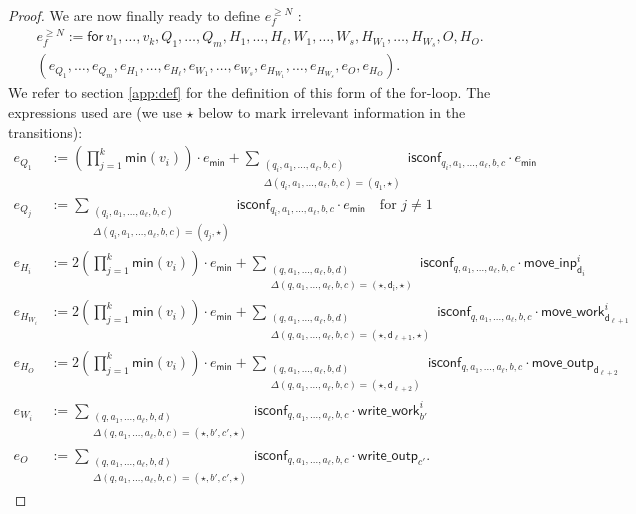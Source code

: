 \begin{proof}
We are now finally ready to define $e_f^{\geq N}$ :
\begin{multline*}
e_f^{\geq N}:= \mathsf{for\,} v_1,\ldots,v_{k},Q_1,\ldots,Q_m,H_1,\ldots,H_\ell,W_1,\ldots,W_s, H_{W_1},\ldots,H_{W_s},O,H_O . \\
(e_{Q_1},\ldots,e_{Q_m},e_{H_1},\ldots,e_{H_\ell},e_{W_1},\ldots,e_{W_s},e_{H_{W_1}},\ldots,e_{H_{W_s}},e_{O}, e_{H_O}).
\end{multline*}
We refer to section \ref{app:def} for the definition of this form of the for-loop. The expressions used are (we use $\star$ below to mark irrelevant information in the transitions):
 \allowdisplaybreaks
\begin{align*}
	e_{Q_1}&:=\left(\prod_{j=1}^{k} \textsf{min}(v_i)\right)\cdot e_{\mathsf{min}}
	+ \sum_{\substack{(q_i,a_1,\ldots,a_\ell,b,c)\\
	\Delta(q_i,a_1,\ldots,a_\ell,b,c)=(q_1,\star)}} \!\!\!\!\!\!\!\!\! \mathsf{isconf}_{q_i,a_1,\ldots,a_\ell,b,c}\cdot e_{\mathsf{min}} \\
	e_{Q_j}&:=\sum_{\substack{(q_i,a_1,\ldots,a_\ell,b,c)\\
	\Delta(q_i,a_1,\ldots,a_\ell,b,c)=(q_j,\star)}} \!\!\!\!\!\!\!\!\! \mathsf{isconf}_{q_i,a_1,\ldots,a_\ell,b,c}\cdot e_{\mathsf{min}}
	 \quad \text{for $j\neq 1$}\\
	e_{H_i}&:=2\left(\prod_{j=1}^{k} \textsf{min}(v_i)\right)\cdot e_{\mathsf{min}}
	+\sum_{\substack{(q,a_1,\ldots,a_\ell,b,d)\\
	\Delta(q,a_1,\ldots,a_\ell,b,c)=(\star,\mathsf{d_i},\star)}}\!\!\!\!\!\!\!\!\! \mathsf{isconf}_{q,a_1,\ldots,a_\ell,b,c}\cdot\mathsf{move\_inp}^i_{\mathsf{d}_i}\\
	e_{H_{W_i}}&:=2\left(\prod_{j=1}^{k} \textsf{min}(v_i)\right)\cdot e_{\mathsf{min}}
	+\sum_{\substack{(q,a_1,\ldots,a_\ell,b,d)\\
	\Delta(q,a_1,\ldots,a_\ell,b,c)=(\star,\mathsf{d_{\ell+1}},\star)}}\!\!\!\!\!\!\!\!\! \mathsf{isconf}_{q,a_1,\ldots,a_\ell,b,c}\cdot\mathsf{move\_work}_{\mathsf{d}_{\ell+1}}^i\\
	e_{H_O}&:=2\left(\prod_{j=1}^{k} \textsf{min}(v_i)\right)\cdot e_{\mathsf{min}}
	+\sum_{\substack{(q,a_1,\ldots,a_\ell,b,d)\\
	\Delta(q,a_1,\ldots,a_\ell,b,c)=(\star,\mathsf{d}_{\ell+2})}}\!\!\!\!\!\!\!\!\! \mathsf{isconf}_{q,a_1,\ldots,a_\ell,b,c}\cdot\mathsf{move\_outp}_{\mathsf{d}_{\ell+2}}\\
	e_{W_i}&:=\sum_{\substack{(q,a_1,\ldots,a_\ell,b,d)\\
	\Delta(q,a_1,\ldots,a_\ell,b,c)=(\star,b',c',\star)}}\!\!\!\!\!\!\!\!\! \mathsf{isconf}_{q,a_1,\ldots,a_\ell,b,c}\cdot\mathsf{write\_work}_{b'}^i\\
	e_{O}&:=\sum_{\substack{(q,a_1,\ldots,a_\ell,b,d)\\
	\Delta(q,a_1,\ldots,a_\ell,b,c)=(\star,b',c',\star)}}\!\!\!\!\!\!\!\!\! \mathsf{isconf}_{q,a_1,\ldots,a_\ell,b,c}\cdot\mathsf{write\_outp}_{c'}.
\end{align*}


\end{proof}
